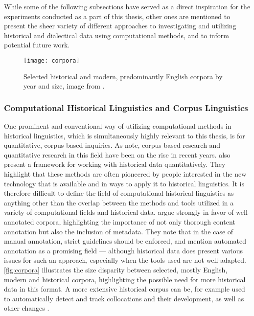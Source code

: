 While some of the following subsections have served as a direct inspiration for the experiments conducted as a part of this thesis, other ones are mentioned to present the sheer variety of different approaches to investigating and utilizing historical and dialectical data using computational methods, and to inform potential future work.

\begin{figure}[h]
\centering
\texttt{[image: corpora]}
\caption{\label{fig:corpora} Selected historical and modern, predominantly English corpora by year and size, image from \citet{quantitative-historical}.}
\end{figure}

\subsubsection{Computational Historical Linguistics and Corpus Linguistics}
\label{subsubsec:comphist-corpus}

One prominent and conventional way of utilizing computational methods in historical linguistics, which is simultaneously highly relevant to this thesis, is for quantitative, corpus-based inquiries. As \citet{gillivray_2023} note, corpus-based research and quantitative research in this field have been on the rise in recent years. \citet{quantitative-historical} also present a framework for working with historical data quantitatively. They highlight that these methods are often pioneered by people interested in the new technology that is available and in ways to apply it to historical linguistics. It is therefore difficult to define the field of computational historical linguistics as anything other than the overlap between the methods and tools utilized in a variety of computational fields and historical data. \citet{quantitative-historical} argue strongly in favor of well-annotated corpora, highlighting the importance of not only thorough content annotation but also the inclusion of metadata. They note that in the case of manual annotation, strict guidelines should be enforced, and mention automated annotation as a promising field --- although historical data does present various issues for such an approach, especially when the tools used are not well-adapted. \autoref{fig:corpora} illustrates the size disparity between selected, mostly English, modern and historical corpora, highlighting the possible need for more historical data in this format. A more extensive historical corpus can be, for example used to automatically detect and track collocations and their development, as well as other changes \citep{garcia-garcia-salido-2019-method}.

